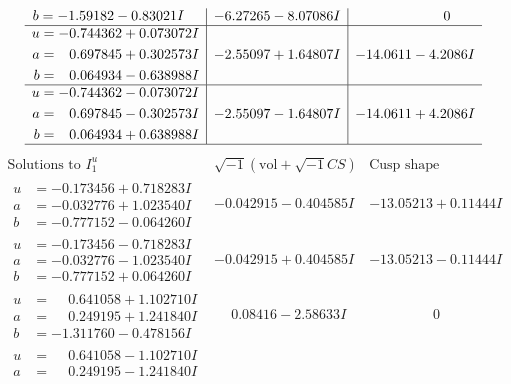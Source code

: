 \documentclass[1p]{elsarticle_modified}
\theoremstyle{definition}
\newcommand{\I}{\sqrt{-1}}
\begin{document}
$$\begin{array}{c|c|c}
\begin{aligned}
b &= -1.59182 - 0.83021 I\end{aligned}
 & -6.27265 - 8.07086 I & \phantom{-0.000000 } 0 \\ \hline\begin{aligned}
u &= -0.744362 + 0.073072 I \\
a &= \phantom{-}0.697845 + 0.302573 I \\
b &= \phantom{-}0.064934 - 0.638988 I\end{aligned}
 & -2.55097 + 1.64807 I & -14.0611 - 4.2086 I \\ \hline\begin{aligned}
u &= -0.744362 - 0.073072 I \\
a &= \phantom{-}0.697845 - 0.302573 I \\
b &= \phantom{-}0.064934 + 0.638988 I\end{aligned}
 & -2.55097 - 1.64807 I & -14.0611 + 4.2086 I\\
 \hline 
 \end{array}$$\newpage$$\begin{array}{c|c|c}  
\text{Solutions to }I^u_{1}& \I (\text{vol} + \sqrt{-1}CS) & \text{Cusp shape}\\
 \hline 
\begin{aligned}
u &= -0.173456 + 0.718283 I \\
a &= -0.032776 + 1.023540 I \\
b &= -0.777152 - 0.064260 I\end{aligned}
 & -0.042915 - 0.404585 I & -13.05213 + 0.11444 I \\ \hline\begin{aligned}
u &= -0.173456 - 0.718283 I \\
a &= -0.032776 - 1.023540 I \\
b &= -0.777152 + 0.064260 I\end{aligned}
 & -0.042915 + 0.404585 I & -13.05213 - 0.11444 I \\ \hline\begin{aligned}
u &= \phantom{-}0.641058 + 1.102710 I \\
a &= \phantom{-}0.249195 + 1.241840 I \\
b &= -1.311760 - 0.478156 I\end{aligned}
 & \phantom{-}0.08416 - 2.58633 I & \phantom{-0.000000 } 0 \\ \hline\begin{aligned}
u &= \phantom{-}0.641058 - 1.102710 I \\
a &= \phantom{-}0.249195 - 1.241840 I \\

\end{aligned}
\end{array}$$
\end{document}
